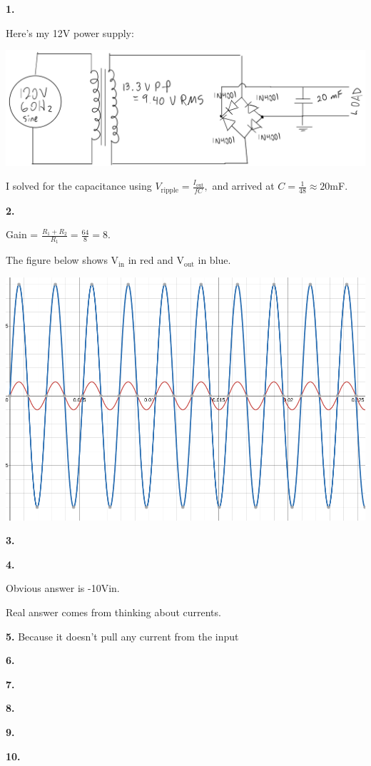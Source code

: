 \documentclass{article}
\begin{document}
\medskip\noindent\textbf{1.} 

    Here's my 12V power supply:
    \begin{center} \includegraphics[scale=.3]{power_supply.png} \end{center}

    I solved for the capacitance using $V_{\text{ripple}} = \frac{I_{\text{out}}}{fC},$ and arrived at $C = \frac{1}{48} \approx 20$mF.

\medskip\noindent\textbf{2.} 

    Gain = $\frac{R_1 + R_2}{R_1} = \frac{64}{8} = 8.$

    The figure below shows $\text{V}_{\text{in}}$ in red and $\text{V}_{\text{out}}$ in blue.
    \begin{center}
        \includegraphics[scale=.3]{2.png}
    \end{center}

\newpage\noindent\textbf{3.}

\medskip\noindent\textbf{4.}

    Obvious answer is -10Vin.

    Real answer comes from thinking about currents.

\medskip\noindent\textbf{5.} Because it doesn't pull any current from the input 

\medskip\noindent\textbf{6.}

\newpage\noindent\textbf{7.} 
    
\medskip\noindent\textbf{8.}

\newpage\noindent\textbf{9.}

\medskip\noindent\textbf{10.}
\end{document}
